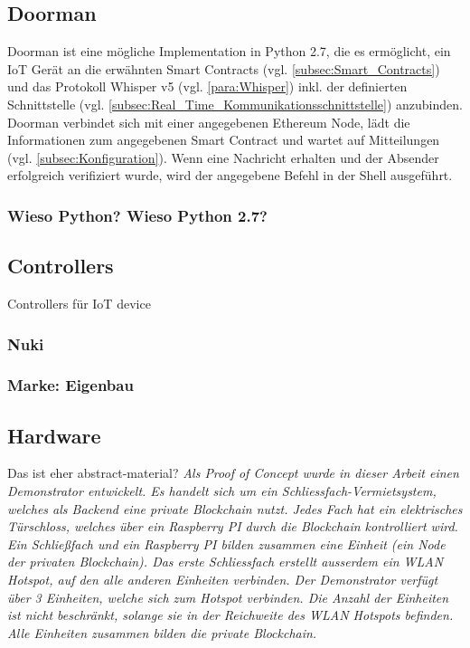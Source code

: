 \subsection{Doorman}
\label{subsec:Doorman}
Doorman ist eine mögliche Implementation in Python 2.7, die es ermöglicht, ein IoT Gerät an die erwähnten Smart Contracts (vgl. \ref{subsec:Smart_Contracts}) und das Protokoll Whisper v5 (vgl. \ref{para:Whisper}) inkl. der definierten Schnittstelle (vgl. \ref{subsec:Real_Time_Kommunikationsschnittstelle}) anzubinden. Doorman verbindet sich mit einer angegebenen Ethereum Node, lädt die Informationen zum angegebenen Smart Contract und wartet auf Mitteilungen (vgl. \ref{subsec:Konfiguration}). Wenn eine Nachricht erhalten und der Absender erfolgreich verifiziert wurde, wird der angegebene Befehl in der Shell ausgeführt.

\subsubsection{Wieso Python? Wieso Python 2.7?}

\subsection{Controllers}
Controllers für IoT device
\subsubsection{Nuki}

\subsubsection{Marke: Eigenbau}

\subsection{Hardware}
Das ist eher abstract-material? \emph{Als Proof of Concept wurde in dieser Arbeit einen Demonstrator entwickelt. Es handelt sich um ein Schliessfach-Vermietsystem, welches als Backend eine private Blockchain nutzt. Jedes Fach hat ein elektrisches Türschloss, welches über ein Raspberry PI durch die Blockchain kontrolliert wird. Ein Schließfach und ein Raspberry PI bilden zusammen eine Einheit (ein Node der privaten Blockchain). Das erste Schliessfach erstellt ausserdem ein WLAN Hotspot, auf den alle anderen Einheiten verbinden. Der Demonstrator verfügt über 3 Einheiten, welche sich zum Hotspot verbinden. Die Anzahl der Einheiten ist nicht beschränkt, solange sie in der Reichweite des WLAN Hotspots befinden. Alle Einheiten zusammen bilden die private Blockchain.}